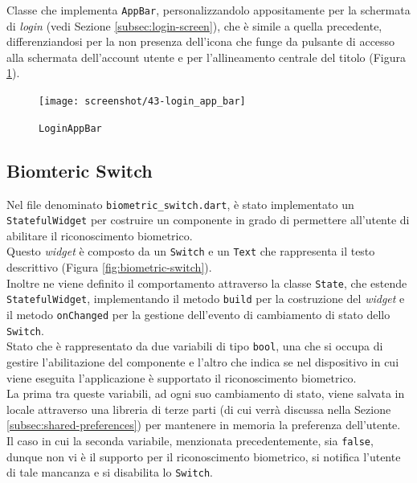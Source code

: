 Classe che implementa \lstinline{AppBar}, personalizzandolo appositamente per la schermata di \emph{login} (vedi Sezione \ref{subsec:login-screen}), che è simile a quella precedente, differenziandosi per la non presenza dell'icona che funge da pulsante di accesso alla schermata dell'account utente e per l'allineamento centrale del titolo (Figura \ref{fig:login-app-bar}).

\begin{figure}[!h] 
    \centering 
    \texttt{[image: screenshot/43-login\_app\_bar]} 
    \caption{\lstinline{LoginAppBar}}
    \label{fig:login-app-bar}
\end{figure}

\subsection{Biomteric Switch}
\label{subsec:biometric-switch}

Nel file denominato \lstinline{biometric_switch.dart}, è stato implementato un \lstinline{StatefulWidget} per costruire un componente in grado di permettere all'utente di abilitare il riconoscimento biometrico. \\
Questo \emph{widget} è composto da un \lstinline{Switch} \cite{site:switch} e un \lstinline{Text} \cite{site:text} che rappresenta il testo descrittivo (Figura \ref{fig:biometric-switch}).\\
Inoltre ne viene definito il comportamento attraverso la classe \lstinline{State}, che estende \lstinline{StatefulWidget}, implementando il metodo \lstinline{build} per la costruzione del \emph{widget} e il metodo \lstinline{onChanged} per la gestione dell'evento di cambiamento di stato dello \lstinline{Switch}.\\
Stato che è rappresentato da due variabili di tipo \lstinline{bool}, una che si occupa di gestire l'abilitazione del componente e l'altro che indica se nel dispositivo in cui viene eseguita l'applicazione è supportato il riconoscimento biometrico.\\
La prima tra queste variabili, ad ogni suo cambiamento di stato, viene salvata in locale attraverso una libreria di terze parti (di cui verrà discussa nella Sezione \ref{subsec:shared-preferences}) per mantenere in memoria la preferenza dell'utente. \\
Il caso in cui la seconda variabile, menzionata precedentemente, sia \lstinline{false}, dunque non vi è il supporto per il riconoscimento biometrico, si notifica l'utente di tale mancanza e si disabilita lo \lstinline{Switch}.


